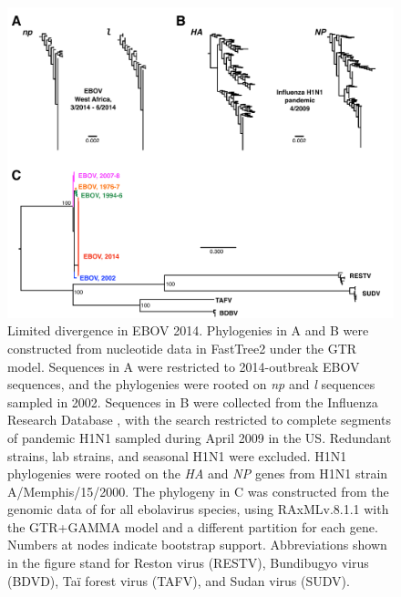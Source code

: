 \documentclass[11pt]{article}
\begin{document}
\clearpage
\begin{figure}[H]
	\centerline{\includegraphics[width=14cm]{ebov_trees_H1N1.pdf}}
	\caption{\label{ebov_flu} Limited divergence in EBOV 2014. Phylogenies in A and B were constructed from nucleotide data in FastTree2 \citep{FTT2} under the GTR model. Sequences in A were restricted to 2014-outbreak EBOV sequences, and the phylogenies were rooted on \emph{np} and \emph{l} sequences sampled in 2002. Sequences in B were collected from the Influenza Research Database \citep{ird}, with the search restricted to complete segments of pandemic H1N1 sampled during April 2009 in the US. Redundant strains, lab strains, and seasonal H1N1 were excluded. H1N1 phylogenies were rooted on the \emph{HA} and \emph{NP} genes from H1N1 strain A/Memphis/15/2000. The phylogeny in C was constructed from the genomic data of \citet{Gire2014} for all ebolavirus species, using RAxMLv.8.1.1 \citep{raxml} with the GTR+GAMMA model and a different partition for each gene. Numbers at nodes indicate bootstrap support. Abbreviations shown in the figure stand for Reston virus (RESTV), Bundibugyo virus (BDVD), Ta\"{i} forest virus (TAFV), and Sudan virus (SUDV). 
	}
\end{figure}
\end{document}
